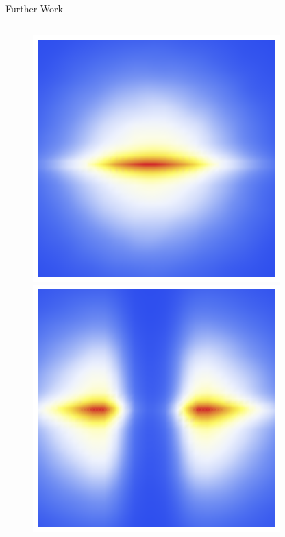 \documentclass{beamer}
\begin{document}
\begin{frame}{Further Work}
\begin{minipage}[t]{\textwidth}
\begin{columns}[t]
\begin{column}{0.1\textwidth}
\begin{figure}
          \includegraphics[scale=0.1]{images/flows-2.png}

          \includegraphics[scale=0.1]{images/flows-3.png}


\end{figure}
\end{column}
\end{columns}
\end{minipage}
\end{frame}
\end{document}
